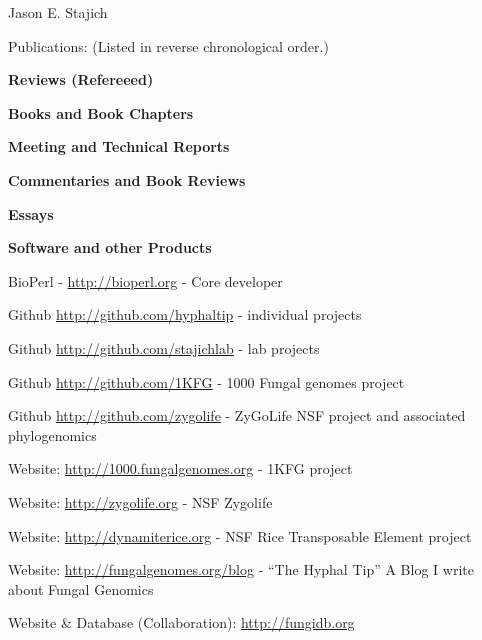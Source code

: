 \documentclass[10pt]{article}
\begin{document}
\begin{cv}{\centerline{Jason E. Stajich}}
\begin{cvlist}{Publications: (Listed in reverse chronological order.)}
\item \textbf{Reviews (Refereeed)}

  \item \textbf{Books and Book Chapters} 


\item \textbf{Meeting and Technical Reports}


\item \textbf{Commentaries and Book Reviews}

  
\item \textbf{Essays}
  
\begin{cvlistcompact}{\bf Software and other Products}
  \item BioPerl - \url{http://bioperl.org} - Core developer
\item Github \url{http://github.com/hyphaltip} - individual
  projects
\item Github \url{http://github.com/stajichlab} - lab
  projects

 \item Github \url{http://github.com/1KFG} - 1000 Fungal
   genomes project
\item Github \url{http://github.com/zygolife} - ZyGoLife NSF project
  and associated phylogenomics
\item Website: \url{http://1000.fungalgenomes.org} - 1KFG project
\item Website: \url{http://zygolife.org} - NSF Zygolife
\item Website: \url{http://dynamiterice.org} - NSF Rice Transposable
    Element project
\item Website: \url{http://fungalgenomes.org/blog} - ``The Hyphal
  Tip'' A Blog I write about Fungal Genomics
\item Website \& Database (Collaboration): \url{http://fungidb.org}
\end{cvlistcompact}



\end{cvlist}
\end{cv}
\end{document}
